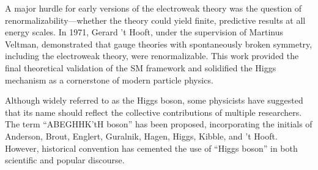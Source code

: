 A major hurdle for early versions of the electroweak theory was the question of renormalizability—whether the theory could yield finite, predictive results at all energy scales. In 1971, Gerard ’t Hooft, under the supervision of Martinus Veltman, demonstrated that gauge theories with spontaneously broken symmetry, including the electroweak theory, were renormalizable. This work provided the final theoretical validation of the SM framework and solidified the Higgs mechanism as a cornerstone of modern particle physics.

Although widely referred to as the Higgs boson, some physicists have suggested that its name should reflect the collective contributions of multiple researchers. The term ``ABEGHHK’tH boson'' has been proposed, incorporating the initials of Anderson, Brout, Englert, Guralnik, Hagen, Higgs, Kibble, and ’t Hooft. However, historical convention has cemented the use of “Higgs boson” in both scientific and popular discourse.








